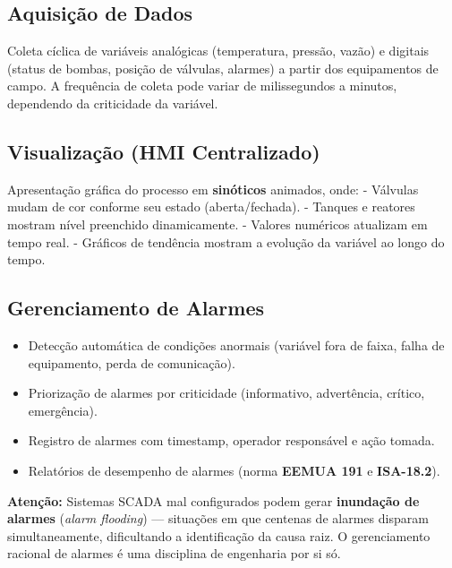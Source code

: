 \subsection{Aquisição de Dados}\label{aquisiuxe7uxe3o-de-dados}

Coleta cíclica de variáveis analógicas (temperatura, pressão, vazão) e digitais (status de bombas, posição de válvulas, alarmes) a partir dos equipamentos de campo. A frequência de coleta pode variar de milissegundos a minutos, dependendo da criticidade da variável.

\subsection{Visualização (HMI Centralizado)}\label{visualizauxe7uxe3o-hmi-centralizado}

Apresentação gráfica do processo em \textbf{sinóticos} animados, onde:
- Válvulas mudam de cor conforme seu estado (aberta/fechada).
- Tanques e reatores mostram nível preenchido dinamicamente.
- Valores numéricos atualizam em tempo real.
- Gráficos de tendência mostram a evolução da variável ao longo do tempo.

\subsection{Gerenciamento de Alarmes}\label{gerenciamento-de-alarmes}

\begin{itemize}
\tightlist
\item
  Detecção automática de condições anormais (variável fora de faixa, falha de equipamento, perda de comunicação).
\item
  Priorização de alarmes por criticidade (informativo, advertência, crítico, emergência).
\item
  Registro de alarmes com timestamp, operador responsável e ação tomada.
\item
  Relatórios de desempenho de alarmes (norma \textbf{EEMUA 191} e \textbf{ISA-18.2}).
\end{itemize}

\begin{caixaatencao}

\textbf{Atenção:} Sistemas SCADA mal configurados podem gerar \textbf{inundação de alarmes} (\emph{alarm flooding}) --- situações em que centenas de alarmes disparam simultaneamente, dificultando a identificação da causa raiz. O gerenciamento racional de alarmes é uma disciplina de engenharia por si só.

\end{caixaatencao}

